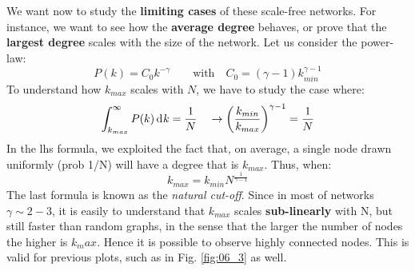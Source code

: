\documentclass[../main/main.tex]{subfiles}
\begin{document}
We want now to study the \textbf{limiting cases} of these scale-free networks. For instance, we want to see how the \textbf{average degree} behaves, or prove that the \textbf{largest degree} scales with the size of the network. Let us consider the power-law:
\begin{equation}
  P(k) = C_0 k^{-\gamma } \qquad \text{with} \quad C_0 = (\gamma -1  ) k_{min}^{\gamma -1 }
\end{equation}
To understand how \( k_{max} \) scales with \( N \), we have to study the case where:
\begin{equation*}
  \int_{k_{max}}^{\infty } P(k) \dd[]{k}  = \frac{1}{N} \quad \rightarrow  \qty(\frac{k_{min}}{k_{max}})^{\gamma -1 } = \frac{1}{N}
\end{equation*}
In the lhs formula, we exploited the fact that, on average, a single node drawn uniformly (prob 1/N) will have a degree that is $k_{max}$. Thus, when:
\begin{equation}
\label{eqn:cut_off_expr}
  k_{max} = k_{min} N^{\frac{1}{\gamma -1 }}
\end{equation}
The last formula is known as the \textit{natural cut-off}.
Since in most of networks \( \gamma \sim 2-3  \), it is easily to understand that $k_{max}$ scales \textbf{sub-linearly} with N, but still faster than random graphs, in the sense that the larger the number of nodes the higher is $k_max$. Hence it is possible to observe highly connected nodes. This is valid for previous plots, such as in Fig. \ref{fig:06_3} as well.
\end{document}
